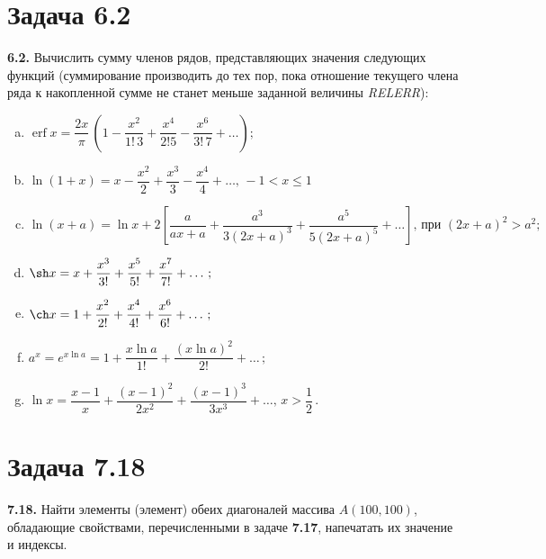 \documentclass[a4paper,12pt]{article}
\DeclareMathOperator\erf{erf}
\begin{document}
\section* {\large Задача 6.2}
\textbf{6.2.} Вычислить сумму членов рядов, представляющих значения
следующих функций (суммирование производить до тех пор, пока отношение
текущего члена ряда к накопленной сумме не станет меньше заданной
величины \textit{RELERR}):
\begin{enumerate}[a)]
  \item
    \begin{math}
      \erf x= \dfrac{2x}{\pi}\,
      \left(
      1 - \dfrac{x^2}{1!\,3} + \dfrac{x^4}{2!5} - \dfrac{x^6}{3!\,7}
      + \ldots
      \right);
    \end{math}
  \item
    \begin{math}
      \ln(1+x)=
      x - \dfrac{x^2}{2} + \dfrac{x^3}{3} - \dfrac{x^4}{4} + \ldots,\, -1<x\le 1
    \end{math}
  \item
    \begin{math}
      \ln(x+a)= \ln x + 2
      \left[
        \dfrac{a}{ax+a} + \dfrac{a^3}{3(2x+a)^3} +
        \dfrac{a^5}{5(2x+a)^5} + \ldots
      \right],\, \text{при $(2x+a)^2 > a^2$};
    \end{math}
  \item
    \begin{math}
      \sh x = x + \dfrac{x^3}{3!} + \dfrac{x^5}{5!} +
      \dfrac{x^7}{7!} + \ldots\,;
    \end{math}
  \item
    \begin{math}
      \ch x = 1 + \dfrac{x^2}{2!} + \dfrac{x^4}{4!} + \dfrac{x^6}{6!}
      + \ldots\,;
    \end{math}
  \item
    \begin{math}
      a^{\displaystyle x} = e^{\displaystyle x\ln a} =
      1 + \dfrac{x \ln a}{1!} + \dfrac{(x \ln a)^2}{2!} + \ldots\,;
    \end{math}
  \item
    \begin{math}
      \ln x = \dfrac{x-1}{x} + \dfrac{(x-1)^2}{2x^2} +
      \dfrac{(x-1)^3}{3x^3} + \ldots,\, x>\dfrac{1}{2}
    \end{math}\,.
\end{enumerate}

\section* {\large Задача 7.18}
\textbf{7.18.} Найти элементы (элемент) обеих диагоналей массива
$A(100, 100)$, обладающие свойствами, перечисленными в задаче
\textbf{7.17}, напечатать их значение и индексы.
\end{document}
